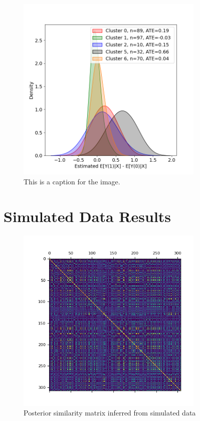 \documentclass{article}
\begin{document}
\begin{figure}[h]
  \centering
  \includegraphics[width=0.8\textwidth]{Plots/NSW_output_histogram.png}
  \caption{This is a caption for the image.}
  \label{fig:sim_data_info}
\end{figure}

\section{Simulated Data Results}

\begin{figure}[H]
  \centering
  \includegraphics[width=0.8\textwidth]{Plots/NSW Posterior Similarity Matrix.png}
  \caption{Posterior similarity matrix inferred from simulated data}
  \label{fig:sim_post_mat}
\end{figure}
\end{document}
